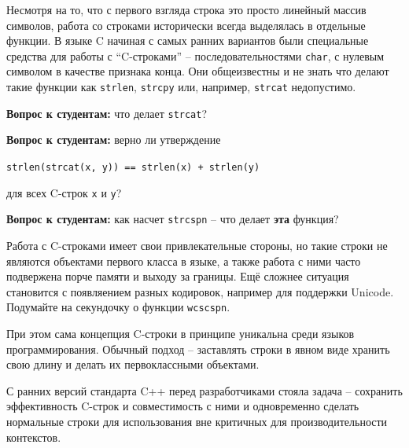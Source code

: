 \documentclass[a4paper,12pt,oneside]{article}
\newif\ifanswers
\begin{document}
Несмотря на то, что с первого взгляда строка это просто линейный массив символов, работа со строками исторически всегда выделялась в отдельные функции. В языке C начиная с самых ранних вариантов были специальные средства для работы с ``C-строками'' -- последовательностями \lstinline!char!, с нулевым символом в качестве признака конца. Они общеизвестны и не знать что делают такие функции как \lstinline!strlen!, \lstinline!strcpy! или, например, \lstinline!strcat! недопустимо.

\textbf{Вопрос к студентам:} что делает \lstinline!strcat!?

\ifanswers
Правильный ответ: дописывает в конец строки, на начало которой указывает первый аргумент, строку, на начало которой указывает второй аргумент. При этом первый символ второй строки замещает завершающий нулевой символ первой
\fi

\textbf{Вопрос к студентам:} верно ли утверждение 

\lstinline!strlen(strcat(x, y)) == strlen(x) + strlen(y)! 

для всех C-строк \lstinline!x! и \lstinline!y!?

\ifanswers
Правильный ответ: да, потому что \lstinline!strlen! не учитывает завершающий нуль
\fi

\textbf{Вопрос к студентам:} как насчет \lstinline!strcspn! -- что делает \textbf{эта} функция?

\ifanswers
Правильный ответ: вычисляет длину максимального начального сегмента первого аргумента не содержащего ни одного символа из второго аргумента. Знать это вовсе не обязательно. За пример полезного использования этой функции автор был бы признателен.
\fi

Работа с C-строками имеет свои привлекательные стороны, но такие строки не являются объектами первого класса в языке, а также работа с ними часто подвержена порче памяти и выходу за границы. Ещё сложнее ситуация становится с появляением разных кодировок, например для поддержки Unicode. Подумайте на секундочку о функции \lstinline!wcscspn!.

При этом сама концепция C-строки в принципе уникальна среди языков программирования. Обычный подход -- заставлять строки в явном виде хранить свою длину и делать их первоклассными объектами.

С ранних версий стандарта C++ перед разработчиками стояла задача -- сохранить эффективность C-строк и совместимость с ними и одновременно сделать нормальные строки для использования вне критичных для производительности контекстов.
\end{document}
